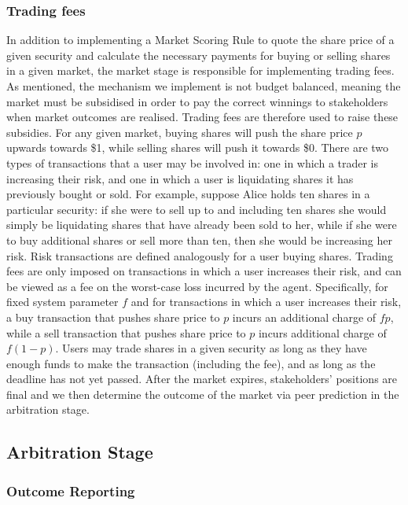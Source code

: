 \subsubsection{Trading fees}

In addition to implementing a Market Scoring Rule to quote the share price of a
given security and calculate the necessary payments for buying or selling
shares in a given market, the market stage is responsible for implementing
trading fees. As mentioned, the mechanism we implement is not budget balanced,
meaning the market must be subsidised in order to pay the correct winnings to
stakeholders when market outcomes are realised. Trading fees are therefore used
to raise these subsidies. For any given market, buying shares will push the
share price $p$ upwards towards \$1, while selling shares will push it towards
\$0. There are two types of transactions that a user may be involved in: one in
which a trader is increasing their risk, and one in which a user is liquidating
shares it has previously bought or sold. For example, suppose Alice holds ten
shares in a particular security: if she were to sell up to and including ten
shares she would simply be liquidating shares that have already been sold to
her, while if she were to buy additional shares or sell more than ten, then she
would be increasing her risk. Risk transactions are defined analogously for a
user buying shares. Trading fees are only imposed on transactions in which a
user increases their risk, and can be viewed as a fee on the worst-case loss
incurred by the agent. Specifically, for fixed system parameter $f$ and for
transactions in which a user increases their risk, a buy transaction that
pushes share price to $p$ incurs an additional charge of $fp$, while a sell
transaction that pushes share price to $p$ incurs additional charge of
$f(1-p)$. Users may trade shares in a given security as long as they have
enough funds to make the transaction (including the fee), and as long as the
deadline has not yet passed. After the market expires, stakeholders' positions
are final and we then determine the outcome of the market via peer prediction
in the arbitration stage.

\subsection{Arbitration Stage}

\subsubsection{Outcome Reporting}

